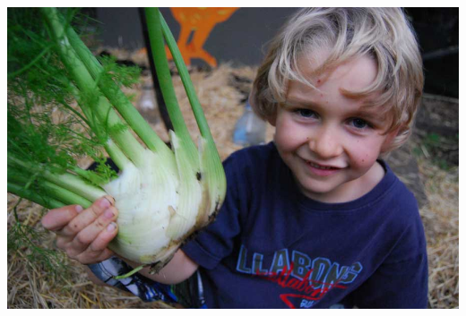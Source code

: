 \documentclass[xcolor=svgnames]{beamer}
\begin{document}
\begin{frame}
\begin{center}\includegraphics[height=0.3\textheight]{pictures/fennel-6_g8.jpg}\end{center}

\end{frame}
\end{document}
